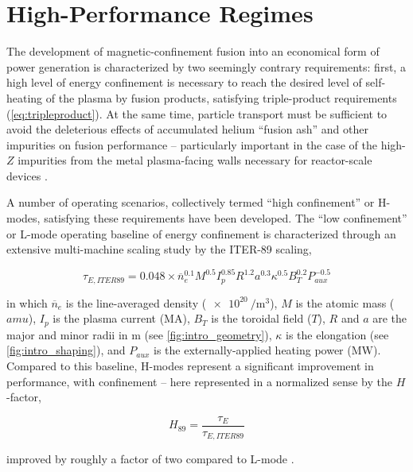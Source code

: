 \chapter{High-Performance Regimes}\label{ch:HighPerformance}

The development of magnetic-confinement fusion into an economical form of power generation is characterized by two seemingly contrary requirements: first, a high level of energy confinement is necessary to reach the desired level of self-heating of the plasma by fusion products, satisfying triple-product requirements (\cref{eq:tripleproduct}).  At the same time, particle transport must be sufficient to avoid the deleterious effects of accumulated helium ``fusion ash'' and other impurities on fusion performance -- particularly important in the case of the high-$Z$ impurities from the metal plasma-facing walls necessary for reactor-scale devices \cite{Loarte2007,Joffrin2014,Neu2011}.

A number of operating scenarios, collectively termed ``high confinement'' or H-modes\cite{Wagner1982,Keilhacker1984}, satisfying these requirements have been developed.  The ``low confinement'' or L-mode operating baseline of energy confinement is characterized through an extensive multi-machine scaling study \cite{Yushmanov1990} by the ITER-89 scaling,

\begin{equation}\label{eq:tau89}
 \tau_{E,ITER89} = 0.048 \times \overline{n}_e^{0.1} M^{0.5} I_p^{0.85} R^{1.2} a^{0.3} \kappa^{0.5} B_T^{0.2} P_{aux}^{-0.5}
\end{equation}

\noindent in which $\overline{n}_e$ is the line-averaged density ($\SI{e20}{\per\meter\cubed}$), $M$ is the atomic mass ($\si{amu}$), $I_p$ is the plasma current ($\si{\mega\ampere}$), $B_T$ is the toroidal field ($\si{T}$), $R$ and $a$ are the major and minor radii in $\si{\meter}$ (see \cref{fig:intro_geometry}), $\kappa$ is the elongation (see \cref{fig:intro_shaping}), and $P_{aux}$ is the externally-applied heating power ($\si{\mega\watt}$).  Compared to this baseline, H-modes represent a significant improvement in performance, with confinement -- here represented in a normalized sense by the $H$-factor, \ie

\begin{equation}\label{eq:H89}
 H_{89} = \frac{\tau_E}{\tau_{E,ITER89}}
\end{equation}

\noindent improved by roughly a factor of two compared to L-mode \cite{Greenwald1997}.

